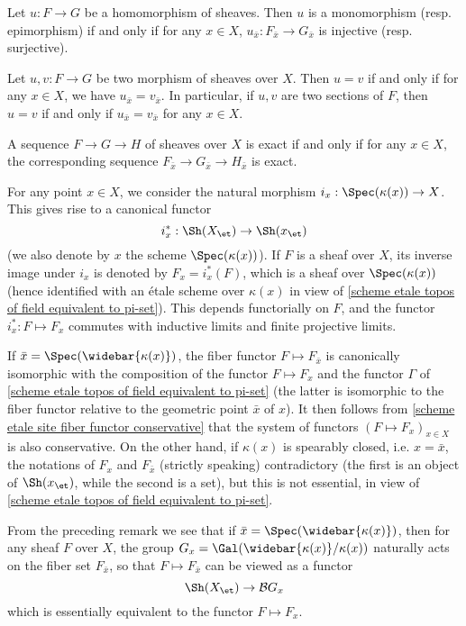 \begin{corollary}\label{scheme etale site homomorphism inj surj iff fiber}
Let $u:F\to G$ be a homomorphism of sheaves. Then $u$ is a monomorphism (resp. epimorphism) if and only if for any $x\in X$, $u_{\bar{x}}:F_{\bar{x}}\to G_{\bar{x}}$ is injective (resp. surjective).
\end{corollary}

\begin{corollary}\label{scheme etale site homomorphism equal iff fiber}
Let $u,v:F\to G$ be two morphism of sheaves over $X$. Then $u=v$ if and only if for any $x\in X$, we have $u_{\bar{x}}=v_{\bar{x}}$. In particular, if $u,v$ are two sections of $F$, then $u=v$ if and only if $u_{\bar{x}}=v_{\bar{x}}$ for any $x\in X$.
\end{corollary}

\begin{corollary}\label{scheme etale site exact sequence iff fiber}
A sequence $F\to G\to H$ of sheaves over $X$ is exact if and only if for any $x\in X$, the corresponding sequence $F_{\bar{x}}\to G_{\bar{x}}\to H_{\bar{x}}$ is exact.
\end{corollary}

For any point $x\in X$, we consider the natural morphism $i_x:\Spec(\kappa(x))\to X$. This gives rise to a canonical functor
\[i_x^*:\Sh(X_\et)\to\Sh(x_\et)\]
(we also denote by $x$ the scheme $\Spec(\kappa(x))$). If $F$ is a sheaf over $X$, its inverse image under $i_x$ is denoted by $F_x=i_x^*(F)$, which is a sheaf over $\Spec(\kappa(x))$ (hence identified with an \'etale scheme over $\kappa(x)$ in view of \cref{scheme etale topos of field equivalent to pi-set}). This depends functorially on $F$, and the functor $i_x^*:F\mapsto F_x$ commutes with inductive limits and finite projective limits.\par
If $\bar{x}=\Spec(\widebar{\kappa(x)})$, the fiber functor $F\mapsto F_{\bar{x}}$ is canonically isomorphic with the composition of the functor $F\mapsto F_x$ and the functor $\Gamma$ of \cref{scheme etale topos of field equivalent to pi-set} (the latter is isomorphic to the fiber functor relative to the geometric point $\bar{x}$ of $x$). It then follows from \cref{scheme etale site fiber functor conservative} that the system of functors $(F\mapsto F_x)_{x\in X}$ is also conservative. On the other hand, if $\kappa(x)$ is spearably closed, i.e. $x=\bar{x}$, the notations of $F_x$ and $F_{\bar{x}}$ (strictly speaking) contradictory (the first is an object of $\Sh(x_\et)$, while the second is a set), but this is not essential, in view of \cref{scheme etale topos of field equivalent to pi-set}.\par
From the preceding remark we see that if $\bar{x}=\Spec(\widebar{\kappa(x)})$, then for any sheaf $F$ over $X$, the group $G_x=\Gal(\widebar{\kappa(x)}/\kappa(x))$ naturally acts on the fiber set $F_{\bar{x}}$, so that $F\mapsto F_{\bar{x}}$ can be viewed as a functor
\[\Sh(X_\et)\to\mathcal{B}G_x\]
which is essentially equivalent to the functor $F\mapsto F_x$.

